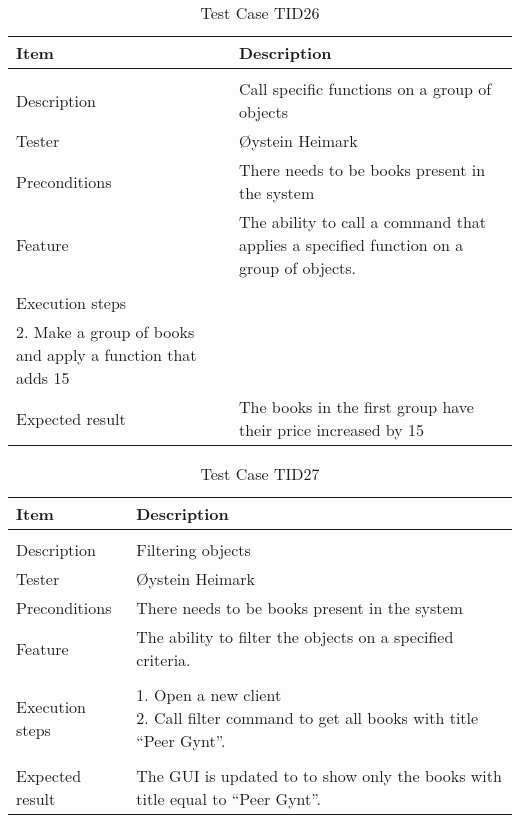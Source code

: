 \begin{table}[H]
\caption{Test Case TID26}
\centering
\begin{tabular}{ l p{13cm} }
\hline 
 Item            & Description        \\ 
\hline \\ [-2.0ex]
 Description     & Call specific functions on a group of objects \\ 
 Tester          & Øystein Heimark                  \\ 
 Preconditions   & There needs to be books present in the system\\ 
 Feature         & The ability to call a command that applies a specified function on a group of objects.   \vspace{3pt}                     \\ 
\hline \\ [-1.5ex]
 Execution steps & \pbox{13cm}{1. Open a new client \\ 2. Make a group of books and apply a function that adds 15%
\hline \\ [-1.5ex]
 Expected result & The books in the first group have their price increased by 15%
\hline 
\end{tabular}
\label{table:testcasetid26}
\end{table}


\begin{table}[H]
\caption{Test Case TID27}
\centering
\begin{tabular}{ l p{13cm} }
\hline 
 Item            & Description        \\ 
\hline \\ [-2.0ex]
 Description     & Filtering objects \\ 
 Tester          & Øystein Heimark                  \\ 
 Preconditions   & There needs to be books present in the system\\ 
 Feature         & The ability to filter the objects on a specified criteria.   \vspace{3pt}                     \\ 
\hline \\ [-1.5ex]
 Execution steps & \pbox{13cm}{1. Open a new client \\ 2. Call filter command to get all books with title “Peer Gynt”. } \vspace{3pt} \\
\hline \\ [-1.5ex]
 Expected result & The GUI is updated to to show only the books with title equal to “Peer Gynt”. \\
\hline 
\end{tabular}
\label{table:testcasetid27}
\end{table}


